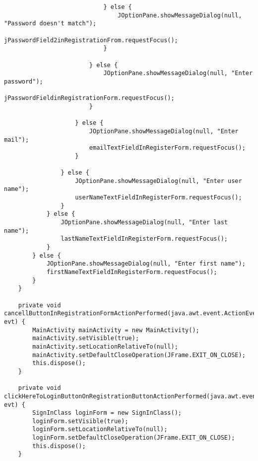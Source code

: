 \documentclass[12pt,a4paper]{article}
\begin{document}
\begin{lstlisting}
                            } else {
                                JOptionPane.showMessageDialog(null, "Password doesn't match");
                                jPasswordField2inRegistrationFrom.requestFocus();
                            }

                        } else {
                            JOptionPane.showMessageDialog(null, "Enter password");
                            jPasswordFieldinRegistrationForm.requestFocus();
                        }

                    } else {
                        JOptionPane.showMessageDialog(null, "Enter mail");
                        emailTextFieldInRegisterForm.requestFocus();
                    }

                } else {
                    JOptionPane.showMessageDialog(null, "Enter user name");
                    userNameTextFieldInRegisterForm.requestFocus();
                }
            } else {
                JOptionPane.showMessageDialog(null, "Enter last name");
                lastNameTextFieldInRegisterForm.requestFocus();
            }
        } else {
            JOptionPane.showMessageDialog(null, "Enter first name");
            firstNameTextFieldInRegisterForm.requestFocus();
        }
    }                                                              

    private void cancellButtonInRegistrationFormActionPerformed(java.awt.event.ActionEvent evt) {                                                                
        MainActivity mainActivity = new MainActivity();
        mainActivity.setVisible(true);
        mainActivity.setLocationRelativeTo(null);
        mainActivity.setDefaultCloseOperation(JFrame.EXIT_ON_CLOSE);
        this.dispose();
    }                                                               

    private void clickHereToLoginButtonOnRegistrationButtonActionPerformed(java.awt.event.ActionEvent evt) {                                                                           
        SignInClass loginForm = new SignInClass();
        loginForm.setVisible(true);
        loginForm.setLocationRelativeTo(null);
        loginForm.setDefaultCloseOperation(JFrame.EXIT_ON_CLOSE);
        this.dispose();
    }                                                                          


\end{lstlisting}
\end{document}
